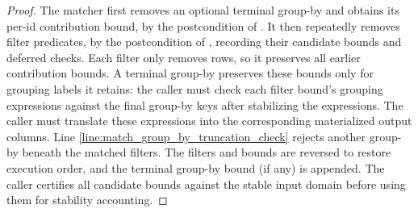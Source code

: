 \documentclass{article}
\begin{document}
\begin{proof}
    The matcher first removes an optional terminal group-by and obtains its
    per-id contribution bound, by the postcondition of
    .
    It then repeatedly removes filter predicates, by the postcondition of
    ,
    recording their candidate bounds and deferred checks.
    Each filter only removes rows, so it preserves all earlier contribution bounds.
    A terminal group-by preserves these bounds only for grouping labels it retains:
    the caller must check each filter bound's grouping expressions against the final group-by keys
    after stabilizing the expressions.
    The caller must translate these expressions into the corresponding materialized output columns.
    Line \ref{line:match_group_by_truncation_check} rejects another group-by
    beneath the matched filters. The filters and bounds are reversed to restore
    execution order, and the terminal group-by bound (if any) is appended.
    The caller certifies all candidate bounds against the stable input domain
    before using them for stability accounting.
\end{proof}
\end{document}
